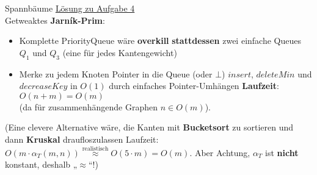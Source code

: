 \begin{frame}{Spannbäume}
	\underline{Lösung zu Aufgabe 4} \\
	Getweaktes \textbf{Jarník-Prim}: \\
	\begin{itemize}
		\item Komplette PriorityQueue wäre \textbf{overkill} \impl \textbf{stattdessen} zwei einfache Queues $Q_1$ und $Q_3$ \quad (eine für jedes Kantengewicht)
		\item Merke zu jedem Knoten Pointer in die Queue (oder $\bot$)
		\implitem $insert$, $deleteMin$ und $decreaseKey$ in $O(1)$ durch einfaches Pointer-Umhängen
		\implitem \textbf{Laufzeit}: $O(n + m) = O(m)$ \\ (da für zusammenhängende Graphen $n \in O(m)$).
	\end{itemize}
	\forcenewline
	(Eine clevere Alternative wäre, die Kanten mit \textbf{Bucketsort} zu sortieren und dann \textbf{Kruskal} draufloszulassen \impl Laufzeit: $O\left(m \cdot \alpha_T(m, n)\right) \stackrel{\text{realistisch}}{\approx} O(5 \cdot m) = O(m)$. {\small Aber Achtung, $\alpha_T$ ist \textbf{nicht} konstant, deshalb „$\approx$“!})
\end{frame}



\iffalse

\begin{frame}{Graphen}
	\underline{Aufgabe 5: } \\
	Konstruiert einen gerichteten Graphen mit $n$ Knoten und negativen Kantengewichten (aber \textbf{ohne} negative Zyklen!) so, dass Dijkstra darauf eine Laufzeit in $\Theta(n^3\log n)$ erreicht.
\end{frame}

\fi


